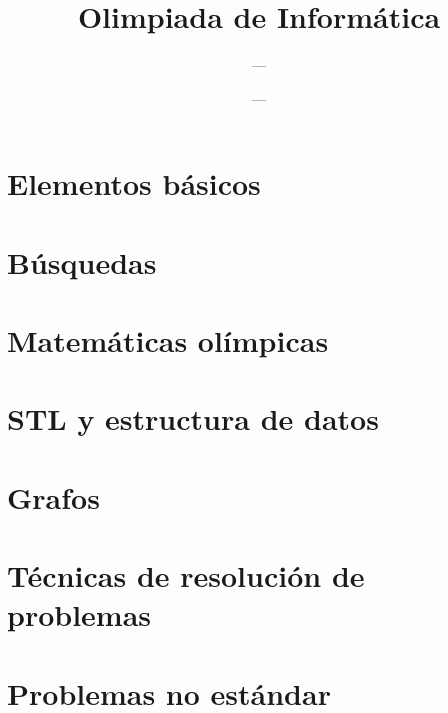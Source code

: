 \documentclass{book}
\begin{document}
	
	
\title{Olimpiada de Informática}
\author{---}
\date{---}


\frontmatter

\maketitle
\tableofcontents

\mainmatter

\part{Elementos básicos}

\part{Búsquedas}



\part{Matemáticas olímpicas}

\part{STL y estructura de datos}

\part{Grafos}

\part{Técnicas de resolución de problemas}

\part{Problemas no estándar}

\backmatter
\end{document}
